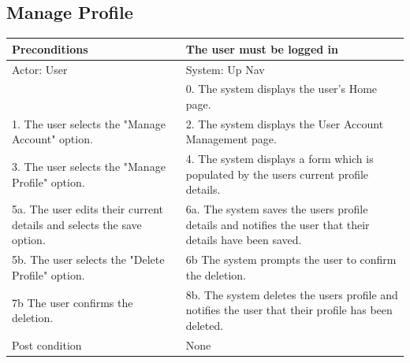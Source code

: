 \documentclass{article}
\begin{document}
\begin{enumerate}
	\subsection{Manage Profile}
	\begin{tabular}{ | m{15em} | m{15em}| }
		\hline
		Preconditions                                                       						& The user must be logged in \\ 				
		\hline
		Actor: User                                                       							& System: Up Nav \\ 			
		\hline
                                                                  									& 0. The system displays the user's Home page. \\                                                           
		 \hline
		1. The user selects the "Manage Account" option.						& 2. The system displays the User Account Management page. \\
		 \hline
		3. The user selects the "Manage Profile" option. 						& 4.  The system displays a form which is populated by the users current profile details. \\
		\hline
		5a. The user edits their current details and selects the save option. 			& 6a. The system saves the users profile details and notifies the user that their details have been saved. \\ 
		\hline
		5b. The user selects the "Delete Profile" option.						& 6b The system prompts the user to confirm the deletion. \\
		\hline
		7b The user confirms the deletion.								& 8b. The system deletes the users profile and notifies the user that their profile has been deleted. \\
		\hline
		Post condition                                                     						& None \\ 			
		\hline
	\end{tabular}


\end{enumerate}
\end{document}
